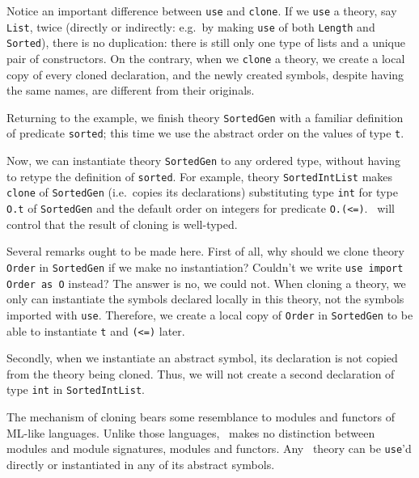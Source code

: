 Notice an important difference between \texttt{use}
and \texttt{clone}. If we \texttt{use} a theory, say
\texttt{List}, twice (directly or indirectly: e.g.~by
making \texttt{use} of both \texttt{Length} and
\texttt{Sorted}), there is no duplication: there is
still only one type of lists and a unique pair
of constructors. On the contrary, when we \texttt{clone}
a theory, we create a local copy of every cloned
declaration, and the newly created symbols, despite
having the same names, are different from their originals.

Returning to the example, we finish theory \texttt{SortedGen}
with a familiar definition of predicate \texttt{sorted};
this time we use the abstract order on the values of type
\texttt{t}.

Now, we can instantiate theory \texttt{SortedGen} to any
ordered type, without having to retype the definition of
\texttt{sorted}. For example, theory \texttt{SortedIntList}
makes \texttt{clone} of \texttt{SortedGen} (i.e.~copies its
declarations) substituting type \texttt{int} for type
\texttt{O.t} of \texttt{SortedGen} and the default order
on integers for predicate \texttt{O.(<=)}. \why\ will
control that the result of cloning is well-typed.

Several remarks ought to be made here. First of all, why should
we clone theory \texttt{Order} in \texttt{SortedGen} if we make
no instantiation? Couldn't we write \texttt{use import Order as O}
instead? The answer is no, we could not. When cloning a theory,
we only can instantiate the symbols declared locally in this theory,
not the symbols imported with \texttt{use}. Therefore, we create
a local copy of \texttt{Order} in \texttt{SortedGen} to be able
to instantiate \texttt{t} and \texttt{(<=)} later.

Secondly, when we instantiate an abstract symbol, its declaration
is not copied from the theory being cloned. Thus, we will not create
a second declaration of type \texttt{int} in \texttt{SortedIntList}.

The mechanism of cloning bears some resemblance to modules and functors
of ML-like languages. Unlike those languages, \why\ makes no distinction
between modules and module signatures, modules and functors. Any \why\
theory can be \texttt{use}'d directly or instantiated in any of its
abstract symbols.

